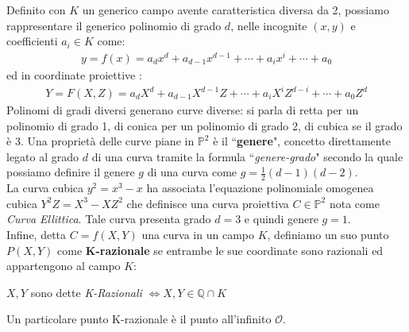\documentclass[a4paper,12pt]{tesiinfo}
\newcommand\ddfrac[2]{\frac{\displaystyle #1}{\displaystyle #2}}
\renewcommand{\footnotesize}{\fontsize{9pt}{11pt}\selectfont}
\begin{document}
%
%
%
%
%
%
%
%
Definito con $K$ un generico campo avente caratteristica diversa da 2, possiamo rappresentare il generico polinomio di grado $d$, nelle incognite $(x, y)$ e coefficienti $a_i \in K$ come:
\begin{align*}
 y = f(x) = a_dx^d + a_{d-1}x^{d-1} + \cdots + a_ix^i + \cdots + a_0
\end{align*}
ed in coordinate proiettive \cite{baseTheory_CurvePianeCubiche}:
\begin{align*}
 Y = F(X, Z) = a_dX^d + a_{d-1}X^{d-1}Z + \cdots + a_iX^iZ^{d-i} + \cdots + a_0Z^d
\end{align*}
Polinomi di gradi diversi generano curve diverse: si parla di retta per un polinomio di grado 1, di conica per un polinomio di grado 2, di cubica se il grado \`e 3. Una propriet\`a delle curve piane in $\mathbb{P}^2$ \`e il ``\textbf{genere}", concetto direttamente legato al grado $d$ di una curva tramite la formula ``\textit{genere-grado}" secondo la quale possiamo definire il genere $g$ di una curva come $g = \ddfrac{1}{2} (d-1)(d-2)$.
\\
La curva cubica $y^2 = x^3 -x$ ha associata l'equazione polinomiale omogenea cubica $Y^2Z = X^3 - XZ^2$ che definisce una curva proiettiva $C \in \mathbb{P}^2$ nota come \textit{Curva Ellittica}. Tale curva presenta grado $d = 3$ e quindi genere $g = 1$.\\
Infine, detta $C = f(X, Y)$ una curva in un campo $K$, definiamo un suo punto $P(X, Y)$ come \textbf{$\mathbold{K}$-razionale} se entrambe le sue coordinate sono razionali ed appartengono al campo $K$:
\begin{center}
$X, Y $ sono dette \textit{K-Razionali} $\iff X, Y \in \mathbb{Q} \cap  K$
\end{center}
Un particolare punto K-razionale \`e il punto all'infinito $\mathcal{O}$.
%
%
%
\end{document}
